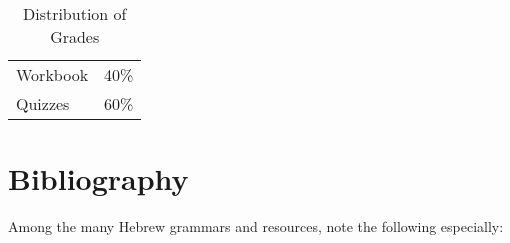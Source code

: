 \documentclass[titlepage]{article}
\newcommand\policy{../policy}
\begin{document}
\begin{table}[htbp]
  \centering
  {\lining
  \begin{tabular}{lr}
    \toprule
    Workbook & 40\% \\
    Quizzes  & 60\% \\
    \bottomrule
  \end{tabular}}
  \caption{Distribution of Grades}
  \label{distribution}
\end{table}





\section{Bibliography}
\label{bib}

Among the many Hebrew grammars and resources, note the following
especially:
\end{document}
